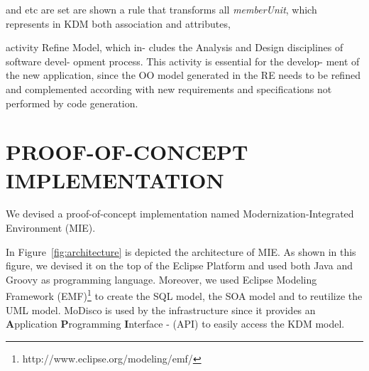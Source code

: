 \documentclass[a4paper,twoside]{article}
\newcommand*\circled[1]{\tikz[baseline=(char.base)]{
  \node[shape=circle,draw, inner sep=0.1pt] (char) {#1};}
}
\begin{document}
  and etc are set  are shown a rule that transforms all \textit{memberUnit}, which represents in KDM both association and attributes,      


  activity Refine Model, which in- cludes the Analysis and Design disciplines of software devel- opment process. This activity is essential for the develop- ment of the new application, since the OO model generated in the RE needs to be refined and complemented according with new requirements and specifications not performed by code generation.










\section{\uppercase{Proof-of-concept implementation}}\label{sec:proof_of_concept_implementation}

We devised a proof-of-concept implementation named Modernization-Integrated Environment (MIE). 


In Figure~\ref{fig:architecture} is depicted the architecture of MIE. As shown in this figure, we devised it on the top of the Eclipse Platform and used both Java and Groovy as programming language. Moreover, we used Eclipse Modeling Framework (EMF)\footnote{http://www.eclipse.org/modeling/emf/} to create the SQL model, the SOA model and to reutilize the UML model. MoDisco is used by the infrastructure since it provides an
\textbf{A}pplication \textbf{P}rogramming \textbf{I}nterface - (API) to easily access the KDM model. 
\end{document}
